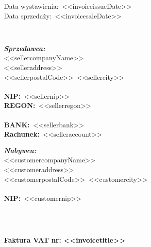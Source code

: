 \documentclass[12pt]{article}
\newcommand{\nipText}{\textbf{NIP:}}
\newcommand{\regonText}{\textbf{REGON:}}
\newcommand{\bankText}{\textbf{BANK:}}
\newcommand{\accountText}{\textbf{Rachunek:}}
\begin{document}
    \begin{footnotesize}
        \begin{flushright}
            \begin{minipage}[t]{.4\textwidth}
                Data wystawienia:~<<invoiceissueDate>> \\
                Data sprzedaży:~<<invoicesaleDate>>
            \end{minipage}
        \end{flushright}
    \end{footnotesize}

    \ \\

    \begin{small}
        \begin{minipage}[t]{.6\textwidth}
            \textbf{\emph{Sprzedawca:}} \\
            <<sellercompanyName>> \\
            <<selleraddress>> \\
            <<sellerpostalCode>>~<<sellercity>> \\ \\
            \nipText~<<sellernip>> \\
            \regonText~<<sellerregon>> \\ \\
            \bankText~<<sellerbank>> \\
            \accountText~<<selleraccount>>
        \end{minipage}
        \begin{minipage}[t]{\textwidth}
            \textbf{\emph{Nabywca:}} \\
            <<customercompanyName>> \\
            <<customeraddress>> \\
            <<customerpostalCode>>~<<customercity>> \\ \\
            \nipText~<<customernip>>
        \end{minipage}
    \end{small}

    \ \\ \ \\

    \centerline{\textbf{\LARGE{Faktura VAT nr: <<invoicetitle>>}}}

    \ \\
\end{document}
